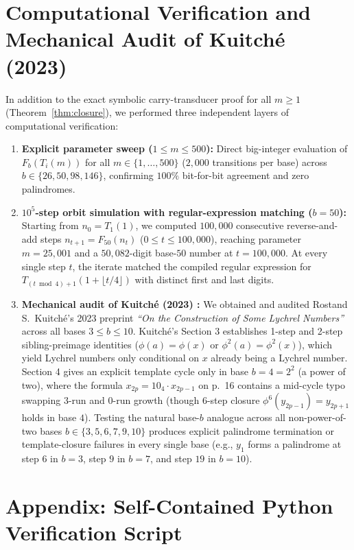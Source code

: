 \documentclass[11pt,a4paper]{article}
\theoremstyle{definition}
\theoremstyle{remark}
\begin{document}
\section{Computational Verification and Mechanical Audit of Kuitch\'{e} (2023)}

In addition to the exact symbolic carry-transducer proof for all $m \ge 1$ (Theorem~\ref{thm:closure}), we performed three independent layers of computational verification:
\begin{enumerate}
  \item \textbf{Explicit parameter sweep ($1 \le m \le 500$):} Direct big-integer evaluation of $F_b(T_i(m))$ for all $m \in \{1, \dots, 500\}$ ($2{,}000$ transitions per base) across $b \in \{26, 50, 98, 146\}$, confirming $100\%$ bit-for-bit agreement and zero palindromes.
  \item \textbf{$10^5$-step orbit simulation with regular-expression matching ($b = 50$):} Starting from $n_0 = T_1(1)$, we computed $100{,}000$ consecutive reverse-and-add steps $n_{t+1} = F_{50}(n_t)$ ($0 \le t \le 100{,}000$), reaching parameter $m = 25{,}001$ and a $50{,}082$-digit base-$50$ number at $t = 100{,}000$. At every single step $t$, the iterate matched the compiled regular expression for $T_{(t \bmod 4)+1}(1 + \lfloor t/4 \rfloor)$ with distinct first and last digits.
  \item \textbf{Mechanical audit of Kuitch\'{e} (2023) \cite{kuitche2023}:} We obtained and audited Rostand S.~Kuitch\'{e}'s 2023 preprint \emph{``On the Construction of Some Lychrel Numbers''} across all bases $3 \le b \le 10$. Kuitch\'{e}'s Section 3 establishes 1-step and 2-step sibling-preimage identities ($\phi(a) = \phi(x)$ or $\phi^2(a) = \phi^2(x)$), which yield Lychrel numbers only conditional on $x$ already being a Lychrel number. Section 4 gives an explicit template cycle only in base $b = 4 = 2^2$ (a power of two), where the formula $x_{2p} = 10_4 \cdot x_{2p-1}$ on p.~16 contains a mid-cycle typo swapping $3$-run and $0$-run growth (though 6-step closure $\phi^6(y_{2p-1}) = y_{2p+1}$ holds in base $4$). Testing the natural base-$b$ analogue across all non-power-of-two bases $b \in \{3, 5, 6, 7, 9, 10\}$ produces explicit palindrome termination or template-closure failures in every single base (e.g., $y_1$ forms a palindrome at step $6$ in $b=3$, step $9$ in $b=7$, and step $19$ in $b=10$).
\end{enumerate}

\section*{Appendix: Self-Contained Python Verification Script}
\end{document}

